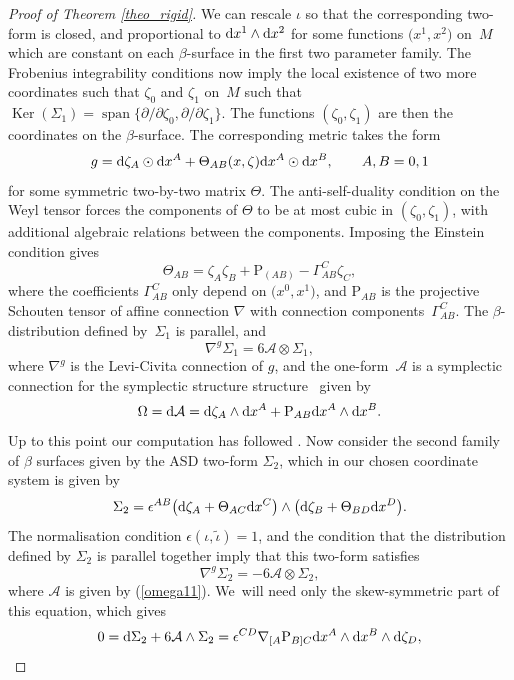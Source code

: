 \documentclass[pdftex]{sigma}%
\numberwithin{equation}{section}
\newcommand{\Rho}{\mathrm{P}}
\def\be{\begin{equation}}
\def\ee{\end{equation}}
\begin{document}
\begin{proof}[Proof of Theorem \ref{theo_rigid}]
We can rescale $\iota$ so that the corresponding two-form is
closed, and proportional to \mbox{${\rm d}x^1\wedge {\rm d}x^2$} for some functions $\big(x^1, x^2\big)$ on~$M$
which are constant on each $\beta$-surface in the first two parameter family.
The Frobenius integrability conditions now imply the local existence of
two more coordinates such that
$\zeta_0$ and $\zeta_1$ on~$M$ such that $\operatorname{Ker}(\Sigma_1)=
\operatorname{span}\{\partial/\partial \zeta_0, \partial/\partial \zeta_1\}$.
The functions $(\zeta_0, \zeta_1)$ are then the coordinates on the $\beta$-surface.
The corresponding metric takes the form
\be
\label{metric_md}
g={\rm d}\zeta_A\odot {\rm d}x^A+\Theta_{AB}(x, \zeta){\rm d}x^A\odot {\rm d}x^B, \qquad A, B=0, 1
\ee
for some symmetric two-by-two matrix $\Theta$. The anti-self-duality
condition on the Weyl tensor forces the components of $\Theta$ to be at most
cubic in $(\zeta_0, \zeta_1)$, with additional algebraic relations between the components. Imposing the Einstein condition gives
\be
\label{thetaAB}
\Theta_{AB}=\zeta_A\zeta_B+\Rho_{(AB)}-\Gamma_{AB}^C\zeta_C,
\ee
where the coefficients $\Gamma_{AB}^C$ only depend on $\big(x^0, x^1\big)$,
and $\Rho_{AB}$ is the projective Schouten tensor of
affine connection $\nabla$ with connection components~$\Gamma_{AB}^C$.
The $\beta$-distribution defined by~$\Sigma_1$ is parallel, and
\[
\nabla^g \Sigma_1=6{\mathcal A}\otimes \Sigma_1,
\]
where $\nabla^g$ is the Levi-Civita connection of $g$, and the one-form~${\mathcal A}$ is a symplectic connection for the symplectic structure
structure~\cite{DM} given by
\be\label{omega11}
\Omega={\rm d}{\mathcal A}={\rm d}\zeta_A\wedge {\rm d}x^A+\Rho_{AB}{\rm d}x^A\wedge {\rm d}x^B.
\ee
Up to this point our computation has followed \cite{DM}. Now consider the second
family of $\beta$ surfaces given by the ASD two-form $\Sigma_2$, which in our
chosen coordinate system is given by
\[
\Sigma_2= \epsilon^{AB}\big({\rm d}\zeta_A+\Theta_{AC}{\rm d}x^C\big)\wedge \big({\rm d}\zeta_B+\Theta_{BD}{\rm d}x^D\big).
\]
The normalisation condition $\epsilon(\iota, \tilde{\iota})=1$, and
the condition that the distribution defined by $\Sigma_2$ is parallel
together imply that this two-form satisfies
\[
\nabla^g\Sigma_2=-6{\mathcal A}\otimes \Sigma_2,
\]
where ${\mathcal A}$ is given by (\ref{omega11}). We~will need only the skew-symmetric part of
this equation, which gives
\begin{gather*}
0={\rm d}\Sigma_2+6{\mathcal A}\wedge\Sigma_2 =\epsilon^{CD}\nabla_{[A}\Rho_{B]C} {\rm d}x^A\wedge {\rm d}x^B\wedge {\rm d}\zeta_D,
\end{gather*}

\end{proof}
\end{document}

